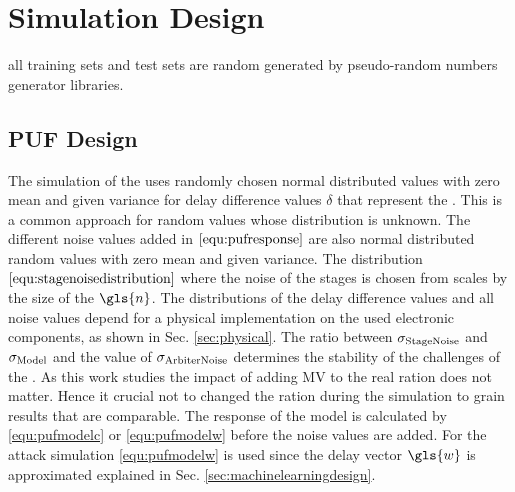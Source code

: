 \chapter{Simulation Design}
\label{cap:simulationdesign}


all training sets and test sets are random generated by pseudo-random numbers generator libraries.


\section{\ac{PUF} Design}
\label{sec:pufsimulation}

The simulation of the \apuf uses randomly chosen normal distributed values with zero mean and given variance for delay difference values $\delta$ that represent the \apuf.
This is a common approach for random values whose distribution is unknown.  %
The different noise values added in $\ref{equ:pufresponse}$ are also normal distributed random values with zero mean and given variance.
The distribution $\ref{equ:stagenoisedistribution}$ where the noise of the stages is chosen from scales by the size of the \apuf $\gls{n}$.
The distributions of the delay difference values and all noise values depend for a physical \apuf implementation on the used electronic components, as shown in Sec. \ref{sec:physical}.
The ratio between $\sigma_{\mathrm{Stage Noise}}$ and $\sigma_{\mathrm{Model}}$ and the value of $\sigma_{\mathrm{Arbiter Noise}}$ determines the stability of the challenges of the \apuf.
As this work studies the impact of adding \ac{MV} to \apufs the real ration does not matter.
Hence it crucial not to changed the ration during the simulation to grain results that are comparable.
The response of the \apuf model is calculated by \ref{equ:pufmodelc} or \ref{equ:pufmodelw} before the noise values are added.
For the attack simulation \ref{equ:pufmodelw} is used since the delay vector $\gls{w}$ is approximated explained in Sec. \ref{sec:machinelearningdesign}.


